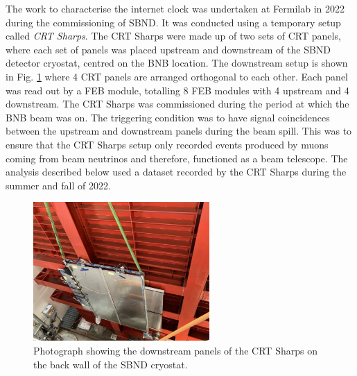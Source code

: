 

The work to characterise the internet clock was undertaken at Fermilab in 2022 during the commissioning of SBND.
It was conducted using a temporary setup called \textit{CRT Sharps}.
The CRT Sharps were made up of two sets of CRT panels, where each set of panels was placed upstream and downstream of the SBND detector cryostat, centred on the BNB location.
The downstream setup is shown in Fig. \ref{fig:crtSharps} where 4 CRT panels are arranged orthogonal to each other.
Each panel was read out by a FEB module, totalling 8 FEB modules with 4 upstream and 4 downstream.
The CRT Sharps was commissioned during the period at which the BNB beam was on. 
The triggering condition was to have signal coincidences between the upstream and downstream panels during the beam spill.
This was to ensure that the CRT Sharps setup only recorded events produced by muons coming from beam neutrinos and therefore, functioned as a beam telescope.
The analysis described below used a dataset recorded by the CRT Sharps during the summer and fall of 2022.

\begin{figure}[htbp!] 
\centering    
\includegraphics[width=0.6\textwidth]{crt_sharps}
\caption[CRT Sharps Photograph]{
Photograph showing the downstream panels of the CRT Sharps on the back wall of the SBND cryostat. 
}
\label{fig:crtSharps}
\end{figure}



